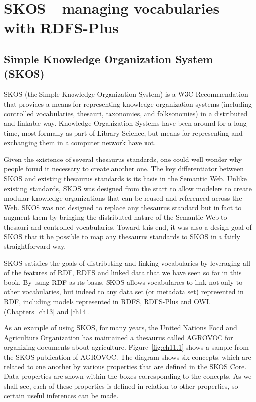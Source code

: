\chapter{SKOS---managing vocabularies with RDFS-Plus}
\label{ch11}



\section{Simple Knowledge Organization System (SKOS)}

SKOS (the Simple Knowledge Organization System) is a W3C Recommendation
that provides a means for representing knowledge organization systems
(including controlled vocabularies, thesauri, taxonomies, and
folksonomies) in a distributed and linkable way. Knowledge Organization
Systems have been around for a long time, most formally as part of
Library Science, but means for representing and exchanging them in a
computer network have not.

Given the existence of several thesaurus standards, one could well
wonder why people found it necessary to create another one. The key
differentiator between SKOS and existing thesaurus standards is its
basis in the Semantic Web. Unlike existing standards, SKOS was designed
from the start to allow modelers to create modular knowledge
organizations that can be reused and referenced across the Web. SKOS was
not designed to replace any thesaurus standard but in fact to augment
them by bringing the distributed nature of the Semantic Web to thesauri
and controlled vocabularies. Toward this end, it was also a design goal
of SKOS that it be possible to map any thesaurus standards to SKOS in a
fairly straightforward way.

SKOS satisfies the goals of distributing and linking vocabularies by leveraging
all of the features of RDF, RDFS and linked data that we have seen so far in this book. 
By using RDF as its basis, SKOS allows vocabularies to link not only to other vocabularies, but 
indeed to any data set (or metadata set) represented in RDF, including 
models represented in RDFS, RDFS-Plus and OWL (Chapters~\ref{ch13} and \ref{ch14}.  

As an example of using SKOS, for many years, the United Nations Food and
Agriculture Organization has maintained a thesaurus called AGROVOC for
organizing documents about agriculture. Figure~\ref{fig:ch11.1} shows a sample from
the SKOS publication of AGROVOC. The diagram shows six concepts, which
are related to one another by various properties that are defined in the
SKOS Core. Data properties are shown within the boxes corresponding to
the concepts. As we shall see, each of these properties is defined in
relation to other properties, so certain useful inferences can be made.

